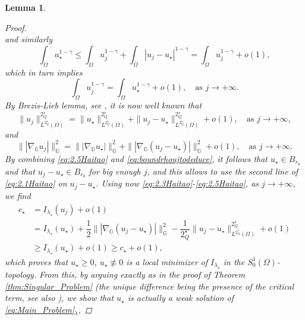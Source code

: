\documentclass[11pt]{amsart}
\numberwithin{equation}{section} %
\newtheorem{lemma}[teo]{Lemma}
\theoremstyle{definition}
\begin{document}
\begin{lemma}
\begin{proof}
\begin{equation*}
		\end{equation*}
		\noindent and similarly
		\begin{equation*}
			\int_{\Omega}u_{\star}^{1-\gamma} \leq \int_{\Omega}u_{j}^{1-\gamma}+\int_{\Omega}|u_j - u_{\star}|^{1-\gamma} = \int_{\Omega}u_{j}^{1-\gamma} + o(1),
		\end{equation*}
		\noindent which in turn implies
		\begin{equation}\label{eq:2.3Haitao}
			\int_{\Omega}u_{j}^{1-\gamma}  = \int_{\Omega}u_{\star}^{1-\gamma}  + o(1), \quad \textrm{as } j \to +\infty.
		\end{equation}
		By Brezis-Lieb lemma, see \cite{BrezisLieb}, it is now well known that
		\begin{equation}
			\|u_j\|^{2^{\star}_{Q}}_{L^{2^{\star}_{Q}}(\Omega)} = \|u_{\star}\|^{2^{\star}_{Q}}_{L^{2^{\star}_{Q}}(\Omega)} + \|u_j - u_{\star}\|^{2^{\star}_{Q}}_{L^{2^{\star}_{Q}}(\Omega)} +o(1), \quad \textrm{as } j \to +\infty,
		\end{equation}
		\noindent and 
		\begin{equation}\label{eq:2.5Haitao}
		\||\nabla_{\mathbb{G}}u_j|\|_{\mathbb{G}}^2 = \||\nabla_{\mathbb{G}}u_{\star}|\|_{\mathbb{G}}^2 + \||\nabla_{\mathbb{G}}(u_j -u_{\star})|\|_{\mathbb{G}}^2 + o(1), \quad \textrm{as } j \to +\infty.
		\end{equation}
		By combining \eqref{eq:2.5Haitao} and \eqref{eq:boundrhoujtodeduce}, 
		it follows that $u_{\star}\in B_{r_0}$ and that
		$u_j - u_{\star} \in B_{r_0}$ for big enough $j$, and this allows to use the second line of \eqref{eq:2.1Haitao} on $u_j - u_{\star}$. 
		Using now \eqref{eq:2.3Haitao}-\eqref{eq:2.5Haitao}, as $j\to +\infty$, we find
		\begin{equation*}
			\begin{aligned}
				c_{\star} &= I_{\lambda_{\star}}(u_j) + o(1)\\
				&= I_{\lambda_{\star}}(u_{\star}) + \dfrac{1}{2}\||\nabla_{\mathbb{G}}(u_j -u_{\star})|\|_{\mathbb{G}}^2- \dfrac{1}{2^{\star}_{Q}}\|u_j - u_{\star}\|^{2^{\star}_{Q}}_{L^{2^{\star}_{Q}}(\Omega)}+ o(1)\\
				&\geq I_{\lambda_{\star}}(u_{\star}) + o(1) \geq c_{\star} + o(1),
			\end{aligned}
		\end{equation*}
		\noindent which proves that $u_{\star} \geq 0$, $u_{\star}\not\equiv
		0$ is a local minimizer of $I_{\lambda_{\star}}$ in the $S^{1}_{0}(\Omega)$-topology.
		From this, by arguing exactly as in the proof
		of Theorem \ref{thm:Singular_Problem} (the unique difference being the presence of the critical term, see also \cite[Lemma 2.1]{Haitao}), we show that $u_{\star}$ is actually a weak solution of  \eqref{eq:Main_Problem}$_\lambda$, 

\end{proof}
\end{lemma}
\end{document}
